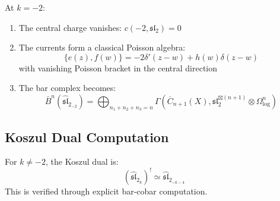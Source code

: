 \begin{theorem}\label{thm:sl2-critical}
At $k = -2$:
\begin{enumerate}
\item The central charge vanishes: $c(-2, \mathfrak{sl}_2) = 0$
\item The currents form a classical Poisson algebra:
\begin{equation}
\{e(z), f(w)\} = -2\delta'(z-w) + h(w)\delta(z-w)
\end{equation}
with vanishing Poisson bracket in the central direction
\item The bar complex becomes:
\begin{equation}
\bar{B}^n(\widehat{\mathfrak{sl}}_2_{-2}) = \bigoplus_{n_1+n_2+n_3=n} \Gamma(\overline{C}_{n+1}(X), \mathfrak{sl}_2^{\boxtimes(n+1)} \otimes \Omega^n_{\log})
\end{equation}
\end{enumerate}
\end{theorem}

\subsection{Koszul Dual Computation}

\begin{theorem}\label{thm:sl2-koszul-dual}
For $k \neq -2$, the Koszul dual is:
\begin{equation}
\boxed{(\widehat{\mathfrak{sl}}_2_k)^! \simeq \widehat{\mathfrak{sl}}_2_{-k-4}}
\end{equation}
This is verified through explicit bar-cobar computation.
\end{theorem}

